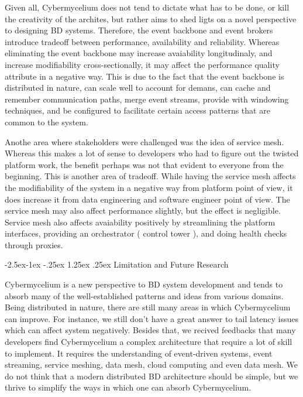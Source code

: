 \documentclass[review]{elsarticle}
\makeatletter
\renewcommand\paragraph{\@startsection{paragraph}{4}{\z@}%
            {-2.5ex\@plus -1ex \@minus -.25ex}%
            {1.25ex \@plus .25ex}%
            {\normalfont\normalsize\itshape}}
\makeatother
\begin{document}
Given all, Cybermycelium does not tend to dictate what has to be done, or kill the creativity of the archites, but rather aims to shed ligts on a novel perspective to designing BD systems. Therefore, the event backbone and event brokers introduce tradeoff between performance, availability and reliability. Whereas eliminating the event backbone may increase avaiability longitudinaly, and increase modifiability cross-sectionally, it may affect the performance quality attribute in a negative way. This is due to the fact that the event backbone is distributed in nature, can scale well to account for demans, can cache and remember communication paths, merge event streams, provide with windowing techniques, and be configured to facilitate certain access patterns that are common to the system.

Anothe area where stakeholders were challenged was the idea of service mesh. Whereas this makes a lot of sense to developers who had to figure out the twisted platform work, the benefit perhaps was not that evident to everyone from the beginning. This is another area of tradeoff. While having the service mesh affects the modifiability of the system in a negative way from platform point of view, it does increase it from data engineering and software engineer point of view. The service mesh may also affect performance slightly, but the effect is negligible. Service mesh also affects avaiability positively by streamlining the platform interfaces, providing an orchestrator ( control tower ), and doing health checks through proxies.

\paragraph{Limitation and Future Research}

Cybermycelium is a new perspective to BD system development and tends to absorb many of the well-established patterns and ideas from various domains. Being distributed in nature, there are still many areas in which Cybermycelium can improve. For instance, we still don't have a great answer to tail latency issues which can affect system negatively. Besides that, we recived feedbacks that many developers find Cybermycelium a complex architecture that require a lot of skill to implement. It requires the understanding of event-driven systems, event streaming, service meshing, data mesh, cloud computing and even data mesh. We do not think that a modern distributed BD architecture should be simple, but we thrive to simplify the ways in which one can absorb Cybermycelium.
\end{document}
